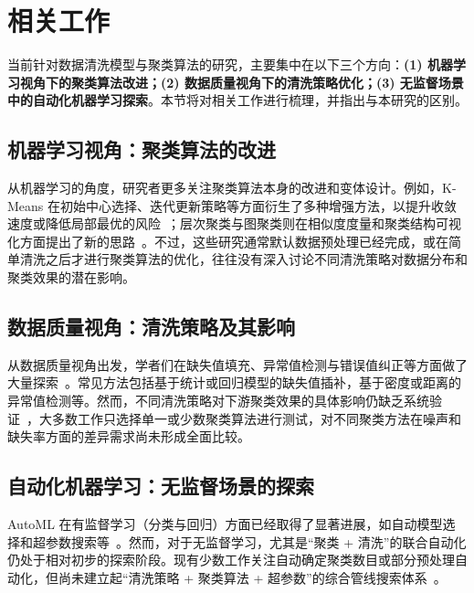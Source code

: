 \documentclass[10pt]{article} %
\numberwithin{equation}{section}
\begin{document}

\section{相关工作}\label{sec:related_work}

当前针对数据清洗模型与聚类算法的研究，主要集中在以下三个方向：\textbf{(1) 机器学习视角下的聚类算法改进；(2) 数据质量视角下的清洗策略优化；(3) 无监督场景中的自动化机器学习探索}。本节将对相关工作进行梳理，并指出与本研究的区别。

\subsection{机器学习视角：聚类算法的改进}
从机器学习的角度，研究者更多关注聚类算法本身的改进和变体设计。例如，K-Means 在初始中心选择、迭代更新策略等方面衍生了多种增强方法，以提升收敛速度或降低局部最优的风险~\cite{ref8, ref9}；层次聚类与图聚类则在相似度度量和聚类结构可视化方面提出了新的思路~\cite{ref10}。不过，这些研究通常默认数据预处理已经完成，或在简单清洗之后才进行聚类算法的优化，往往没有深入讨论不同清洗策略对数据分布和聚类效果的潜在影响。

\subsection{数据质量视角：清洗策略及其影响}
从数据质量视角出发，学者们在缺失值填充、异常值检测与错误值纠正等方面做了大量探索~\cite{ref5, ref6, ref7}。常见方法包括基于统计或回归模型的缺失值插补，基于密度或距离的异常值检测等。然而，不同清洗策略对下游聚类效果的具体影响仍缺乏系统验证~\cite{ref11, ref12}，大多数工作只选择单一或少数聚类算法进行测试，对不同聚类方法在噪声和缺失率方面的差异需求尚未形成全面比较。

\subsection{自动化机器学习：无监督场景的探索}
AutoML 在有监督学习（分类与回归）方面已经取得了显著进展，如自动模型选择和超参数搜索等~\cite{ref13, ref14}。然而，对于无监督学习，尤其是“聚类 + 清洗”的联合自动化仍处于相对初步的探索阶段。现有少数工作关注自动确定聚类数目或部分预处理自动化，但尚未建立起“清洗策略 + 聚类算法 + 超参数”的综合管线搜索体系~\cite{ref15, ref16}。
\end{document}
